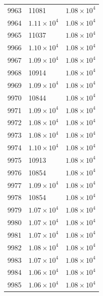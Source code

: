 \begin{table}[H]
\begin{tabular}{lll}
9963 & 11081 & $\displaystyle 1.08 \times 10^{4}$ \\
9964 & $\displaystyle 1.11 \times 10^{4}$ & $\displaystyle 1.08 \times 10^{4}$ \\
9965 & 11037 & $\displaystyle 1.08 \times 10^{4}$ \\
9966 & $\displaystyle 1.10 \times 10^{4}$ & $\displaystyle 1.08 \times 10^{4}$ \\
9967 & $\displaystyle 1.09 \times 10^{4}$ & $\displaystyle 1.08 \times 10^{4}$ \\
9968 & 10914 & $\displaystyle 1.08 \times 10^{4}$ \\
9969 & $\displaystyle 1.09 \times 10^{4}$ & $\displaystyle 1.08 \times 10^{4}$ \\
9970 & 10844 & $\displaystyle 1.08 \times 10^{4}$ \\
9971 & $\displaystyle 1.09 \times 10^{4}$ & $\displaystyle 1.08 \times 10^{4}$ \\
9972 & $\displaystyle 1.08 \times 10^{4}$ & $\displaystyle 1.08 \times 10^{4}$ \\
9973 & $\displaystyle 1.08 \times 10^{4}$ & $\displaystyle 1.08 \times 10^{4}$ \\
9974 & $\displaystyle 1.10 \times 10^{4}$ & $\displaystyle 1.08 \times 10^{4}$ \\
9975 & 10913 & $\displaystyle 1.08 \times 10^{4}$ \\
9976 & 10854 & $\displaystyle 1.08 \times 10^{4}$ \\
9977 & $\displaystyle 1.09 \times 10^{4}$ & $\displaystyle 1.08 \times 10^{4}$ \\
9978 & 10854 & $\displaystyle 1.08 \times 10^{4}$ \\
9979 & $\displaystyle 1.07 \times 10^{4}$ & $\displaystyle 1.08 \times 10^{4}$ \\
9980 & $\displaystyle 1.07 \times 10^{4}$ & $\displaystyle 1.08 \times 10^{4}$ \\
9981 & $\displaystyle 1.07 \times 10^{4}$ & $\displaystyle 1.08 \times 10^{4}$ \\
9982 & $\displaystyle 1.08 \times 10^{4}$ & $\displaystyle 1.08 \times 10^{4}$ \\
9983 & $\displaystyle 1.07 \times 10^{4}$ & $\displaystyle 1.08 \times 10^{4}$ \\
9984 & $\displaystyle 1.06 \times 10^{4}$ & $\displaystyle 1.08 \times 10^{4}$ \\
9985 & $\displaystyle 1.06 \times 10^{4}$ & $\displaystyle 1.08 \times 10^{4}$ \\

\end{tabular}
\end{table}
